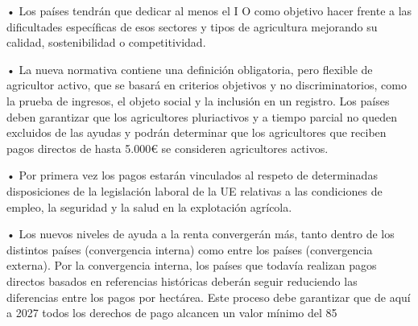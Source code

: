 \documentclass[10pt,a4paper]{article}
\begin{document}
• Los países tendrán que dedicar al menos el I O %
como objetivo hacer frente a las dificultades específicas de esos sectores y tipos de agricultura
mejorando su calidad, sostenibilidad o competitividad.

• La nueva normativa contiene una definición obligatoria, pero flexible de agricultor activo, que se basará en criterios objetivos y no discriminatorios, como la prueba de ingresos, el objeto social y la inclusión en un registro. Los países deben garantizar que los agricultores pluriactivos y a tiempo parcial no queden excluidos de las ayudas y podrán determinar que los agricultores que reciben pagos directos de hasta 5.000€ se consideren agricultores activos.

• Por primera vez los pagos estarán vinculados al respeto de determinadas disposiciones de la legislación laboral de la UE relativas a las condiciones de empleo, la seguridad y la salud en la explotación agrícola.

• Los nuevos niveles de ayuda a la renta convergerán más, tanto dentro de los distintos países (convergencia interna) como entre los países (convergencia externa). Por la convergencia interna, los países que todavía realizan pagos directos basados en referencias históricas deberán seguir reduciendo las diferencias entre los pagos por hectárea. Este proceso debe garantizar que de aquí a 2027 todos los derechos de pago alcancen un valor mínimo del 85 %
\end{document}
